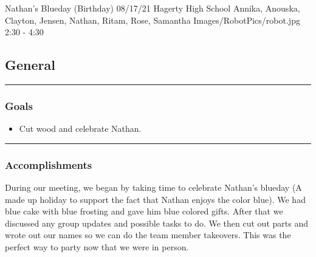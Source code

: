 \insertmeeting 
	{Nathan's Blueday (Birthday)} 
	{08/17/21}
	{Hagerty High School}
	{Annika, Anouska, Clayton, Jensen, Nathan, Ritam, Rose, Samantha}
	{Images/RobotPics/robot.jpg}
	{2:30 - 4:30}
	
\subsection*{General}
\noindent\hfil\rule{\textwidth}{.4pt}\hfil
\subsubsection*{Goals}
\begin{itemize}
    \item Cut wood and celebrate Nathan.

\end{itemize} 

\noindent\hfil\rule{\textwidth}{.4pt}\hfil

\subsubsection*{Accomplishments}
During our meeting, we began by taking time to celebrate Nathan's blueday (A made up holiday to support the fact that Nathan enjoys the color blue). We had blue cake with blue frosting and gave him blue colored gifts. After that we discussed any group updates and possible tasks to do. We then cut out parts and wrote out our names so we can do the team member takeovers. This was the perfect way to party now that we were in person.